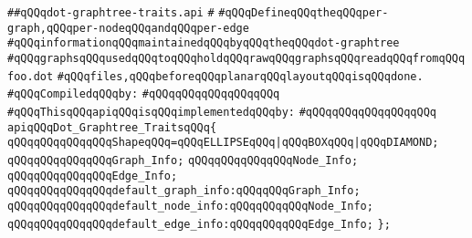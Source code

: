 \label{src/lib/std/dot/dot-graphtree-traits.api}
\verb|##qQQqdot-graphtree-traits.api|\newline
\verb|#|\newline
\verb|#qQQqDefineqQQqtheqQQqper-graph,qQQqper-nodeqQQqandqQQqper-edge|\newline
\verb|#qQQqinformationqQQqmaintainedqQQqbyqQQqtheqQQqdot-graphtree|\newline
\verb|#qQQqgraphsqQQqusedqQQqtoqQQqholdqQQqrawqQQqgraphsqQQqreadqQQqfromqQQqfoo.dot|\newline
\verb|#qQQqfiles,qQQqbeforeqQQqplanarqQQqlayoutqQQqisqQQqdone.|\newline
\newline
\verb|#qQQqCompiledqQQqby:|\newline
\verb|#qQQqqQQqqQQqqQQqqQQq|\newline
\newline
\verb|#qQQqThisqQQqapiqQQqisqQQqimplementedqQQqby:|\newline
\verb|#qQQqqQQqqQQqqQQqqQQq|\newline
\newline
\verb|apiqQQqDot_Graphtree_TraitsqQQq{|\newline
\newline
\verb|qQQqqQQqqQQqqQQqShapeqQQq=qQQqELLIPSEqQQq|\verb#|qQQqBOXqQQq|qQQqDIAMOND;#\newline
\newline
\verb|qQQqqQQqqQQqqQQqGraph_Info;|\newline
\verb|qQQqqQQqqQQqqQQqNode_Info;|\newline
\verb|qQQqqQQqqQQqqQQqEdge_Info;|\newline
\newline
\verb|qQQqqQQqqQQqqQQqdefault_graph_info:qQQqqQQqGraph_Info;|\newline
\verb|qQQqqQQqqQQqqQQqdefault_node_info:qQQqqQQqqQQqNode_Info;|\newline
\verb|qQQqqQQqqQQqqQQqdefault_edge_info:qQQqqQQqqQQqEdge_Info;|\newline
\verb|};|\newline
\newline

